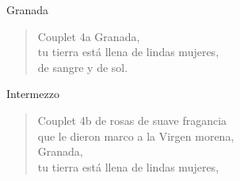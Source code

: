 \begin{song}[vals]{Granada}
\begin{verse}{Couplet 4a}
Granada,\\
tu tierra está llena de lindas mujeres,\\
de sangre y de sol.\\
\end{verse}

\begin{instrumental}{Intermezzo}
\measure*{}\measure{}\measure{}
\end{instrumental}

\begin{verse}{Couplet 4b}
de rosas de suave fragancia\\
que le dieron marco a la Virgen morena,\\
Granada,\\
tu tierra está llena de lindas mujeres,\\
\end{verse}
\clearpage

\end{song}

